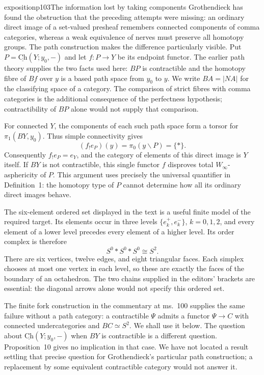 \begin{dcomment}{exposition}{p103}{The information lost by taking components}
Grothendieck has found the obstruction that the preceding attempts were missing: an ordinary direct image of a set-valued presheaf remembers connected components of comma categories, whereas a weak equivalence of nerves must preserve all homotopy groups. The path construction makes the difference particularly visible. Put $P=\underline{\mathrm{Ch}}(Y;y_0,-)$ and let $f:P\to Y$ be its endpoint functor. The earlier path theory supplies the two facts used here: $BP$ is contractible and the homotopy fibre of $Bf$ over $y$ is a based path space from $y_0$ to $y$. We write $BA=|NA|$ for the classifying space of a category. The comparison of strict fibres with comma categories is the additional consequence of the perfectness hypothesis; contractibility of $BP$ alone would not supply that comparison.

For connected $Y$, the components of each such path space form a torsor for $\pi_1(BY,y_0)$. Thus simple connectivity gives
\[
 (f_!e_P)(y)=\pi_0(y\backslash P)=\{*\}.
\]
Consequently $f_!e_P=e_Y$, and the category of elements of this direct image is $Y$ itself. If $BY$ is not contractible, this single functor $f$ disproves total $W_\infty$-asphericity of $P$. This argument uses precisely the universal quantifier in Definition~1: the homotopy type of $P$ cannot determine how all its ordinary direct images behave.

The six-element ordered set displayed in the text is a useful finite model of the required target. Its elements occur in three levels $\{e_k^+,e_k^-\}$, $k=0,1,2$, and every element of a lower level precedes every element of a higher level. Its order complex is therefore
\[
 S^0*S^0*S^0\cong S^2.
\]
There are six vertices, twelve edges, and eight triangular faces. Each simplex chooses at most one vertex in each level, so these are exactly the faces of the boundary of an octahedron. The two chains supplied in the editors' brackets are essential: the diagonal arrows alone would not specify this ordered set.

The finite fork construction in the commentary at ms.~100 supplies the same failure without a path category: a contractible $\Psi$ admits a functor $\Psi\to C$ with connected undercategories and $BC\simeq S^2$. We shall use it below. The question about $\underline{\mathrm{Ch}}(Y;y_0,-)$ when $BY$ is contractible is a different question. Proposition~10 gives no implication in that case. We have not located a result settling that precise question for Grothendieck's particular path construction; a replacement by some equivalent contractible category would not answer it.
\end{dcomment}

